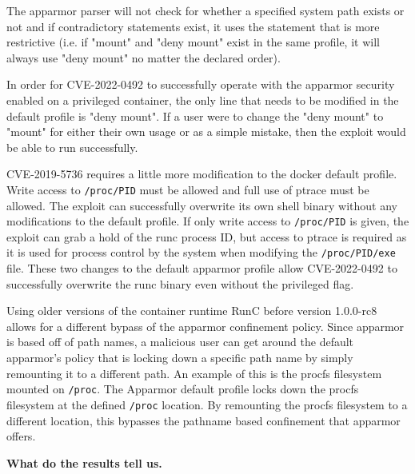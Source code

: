 The apparmor parser will not check for whether a specified system path exists or not and if contradictory statements exist, it uses the statement that is more restrictive (i.e. if "mount" and "deny mount" exist in the same profile, it will always use "deny mount" no matter the declared order).

In order for CVE-2022-0492 to successfully operate with the apparmor security enabled on a privileged container, the only line that needs to be modified in the default profile is "deny mount". If a user were to change the "deny mount" to "mount" for either their own usage or as a simple mistake, then the exploit would be able to run successfully.

CVE-2019-5736 requires a little more modification to the docker default profile. Write access to \texttt{/proc/PID} must be allowed and full use of ptrace must be allowed. The exploit can successfully overwrite its own shell binary without any modifications to the default profile. If only write access to \texttt{/proc/PID} is given, the exploit can grab a hold of the runc process ID, but access to ptrace is required as it is used for process control by the system when modifying the \texttt{/proc/PID/exe} file. These two changes to the default apparmor profile allow CVE-2022-0492 to successfully overwrite the runc binary even without the privileged flag.

Using older versions of the container runtime RunC before version 1.0.0-rc8 allows for a different bypass of the apparmor confinement policy. Since apparmor is based off of path names, a malicious user can get around the default apparmor's policy that is locking down a specific path name by simply remounting it to a different path. An example of this is the procfs filesystem mounted on \texttt{/proc}. The Apparmor default profile locks down the procfs filesystem at the defined \texttt{/proc} location. By remounting the procfs filesystem to a different location, this bypasses the pathname based confinement that apparmor offers.

\noindent\textbf{What do the results tell us.}



